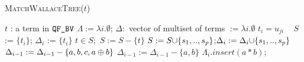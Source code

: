 \begin{algorithm}[t]
 \caption{\textsc{MatchWallaceTree}($t$)}
 \label{alg:wallace}
 \begin{algorithmic}[1]
   \Ensure $t$ : a term in $\texttt{QF\_BV}$
   \State $\Lambda := \lambda i. \emptyset$;
   $\Delta : $ vector of multiset of terms $ := \lambda i. \emptyset$
   \State $t_i = u_{ji}$
   ~\Return{$\emptyset$}
   \State $S$ := $\{t_i\}$; $\Delta_i$ := $\{t_{i}\}$
   \State $t \in S;$ $S := S - \{t\}$
   \State $S := S {\cup} \{s_1,..,s_p\}$;$\Delta_i := \Delta_i {\cup} \{s_1,..,s_p\}$
   \State $\Delta_{i-1} := \Delta_{i-1}- \{a,b,c,a\oplus b\}$
   \State $\Delta_{i-1} := \Delta_{i-1}- \{a,b\}$
   \State $\Lambda_i.insert( a * b )$;
   \Else~\Return{$\emptyset$}
   \EndIf
   \EndFor
   ~\Return{$\emptyset$}
   \EndFor
   \EndFor
   \State {}
   \EndIf
   \State~\Return{$\emptyset$}
 \end{algorithmic}
\end{algorithm}  



